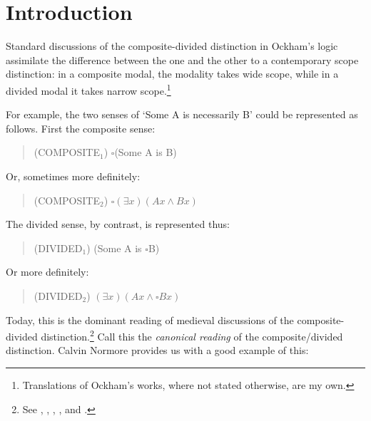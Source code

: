 \documentclass[]{article}
\title{}
\author{}
\begin{document}
\maketitle

\begin{abstract}

\end{abstract}

\section{Introduction}
Standard discussions of the composite-divided distinction in Ockham's logic assimilate the difference between the one and the other to a contemporary scope distinction: in a composite modal, the modality takes wide scope, while in a divided modal it takes narrow scope.\footnote{Translations of Ockham's works, where not stated otherwise, are my own.}

For example, the two senses of `Some A is necessarily B' could be represented as follows. First the composite sense: 

\begin{quote}
	(COMPOSITE$_{1}$) $\square$(Some A is B)
\end{quote}

\noindent Or, sometimes more definitely:

\begin{quote}
	(COMPOSITE$_{2}$) $\square(\exists x)(Ax \wedge Bx)$
\end{quote}

The divided sense, by contrast, is represented thus:

\begin{quote}
	(DIVIDED$_{1}$) (Some A is $\square$B)
\end{quote}

\noindent Or more definitely:

\begin{quote}
	(DIVIDED$_{2}$) $(\exists x)(Ax \wedge \square Bx)$
\end{quote}

Today, this is the dominant reading of medieval discussions of the composite-divided distinction.\footnote{See \cite{PriestRead1981}, \cite{Read2007}, \cite[p. 350]{DutilhNovaes2007}, \cite[p. 298]{Parsons2014}, and \cite[pp. 237-238]{Johnston2015}.} Call this the \textit{canonical reading} of the composite/divided distinction. Calvin Normore provides us with a good example of this:
\end{document}
